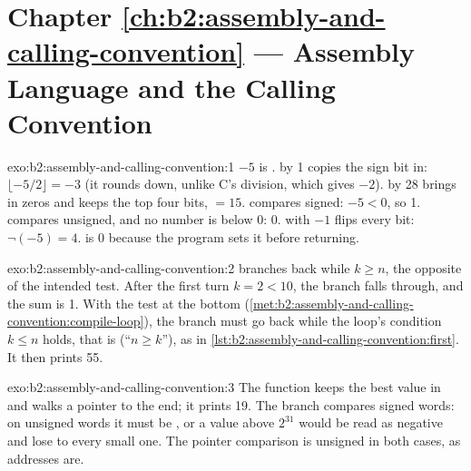 \section*{Chapter \ref{ch:b2:assembly-and-calling-convention} --- Assembly Language and the Calling Convention}

\begin{solution}{exo:b2:assembly-and-calling-convention:1}
$-5$ is .  by 1 copies the sign bit in: $\lfloor -5/2 \rfloor = -3$ (it rounds down,
unlike C's division, which gives $-2$).  by 28 brings in zeros and keeps the top four bits,
 $= 15$.  compares signed: $-5 < 0$, so 1.  compares unsigned, and no number is
below 0: 0.  with $-1$ flips every bit: $\lnot(-5) = 4$.  is 0 because the program sets it
before returning.
\end{solution}

\begin{solution}{exo:b2:assembly-and-calling-convention:2}
 branches back while $k \ge n$, the opposite of the intended test. After the first turn $k =
2 < 10$, the branch falls through, and the sum is 1. With the test at the bottom
(\cref{met:b2:assembly-and-calling-convention:compile-loop}), the branch must go back while the loop's condition
$k \le n$ holds, that is  (``$n \ge k$''), as in \cref{lst:b2:assembly-and-calling-convention:first}.
It then prints 55.
\end{solution}

\begin{solution}{exo:b2:assembly-and-calling-convention:3}
The function keeps the best value in  and walks a pointer to the end; it prints 19. The branch
 compares signed words: on unsigned words it must be , or a value above $2^{31}$
would be read as negative and lose to every small one. The pointer comparison  is unsigned in both cases,
as addresses are.
\end{solution}

